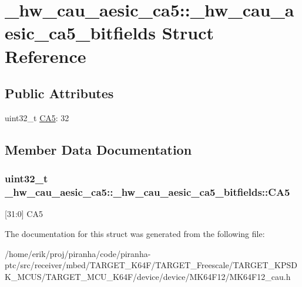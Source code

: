 \hypertarget{struct__hw__cau__aesic__ca5_1_1__hw__cau__aesic__ca5__bitfields}{}\section{\+\_\+hw\+\_\+cau\+\_\+aesic\+\_\+ca5\+:\+:\+\_\+hw\+\_\+cau\+\_\+aesic\+\_\+ca5\+\_\+bitfields Struct Reference}
\label{struct__hw__cau__aesic__ca5_1_1__hw__cau__aesic__ca5__bitfields}
\subsection*{Public Attributes}
\begin{DoxyCompactItemize}
\item 
uint32\+\_\+t \hyperlink{struct__hw__cau__aesic__ca5_1_1__hw__cau__aesic__ca5__bitfields_aa7424c147594c4c75bd752d395c7834c}{C\+A5}\+: 32
\end{DoxyCompactItemize}


\subsection{Member Data Documentation}
\subsubsection[{\texorpdfstring{C\+A5}{CA5}}]{\setlength{\rightskip}{0pt plus 5cm}uint32\+\_\+t \+\_\+hw\+\_\+cau\+\_\+aesic\+\_\+ca5\+::\+\_\+hw\+\_\+cau\+\_\+aesic\+\_\+ca5\+\_\+bitfields\+::\+C\+A5}\hypertarget{struct__hw__cau__aesic__ca5_1_1__hw__cau__aesic__ca5__bitfields_aa7424c147594c4c75bd752d395c7834c}{}\label{struct__hw__cau__aesic__ca5_1_1__hw__cau__aesic__ca5__bitfields_aa7424c147594c4c75bd752d395c7834c}
\mbox{[}31\+:0\mbox{]} C\+A5 

The documentation for this struct was generated from the following file\+:\begin{DoxyCompactItemize}
\item 
/home/erik/proj/piranha/code/piranha-\/ptc/src/receiver/mbed/\+T\+A\+R\+G\+E\+T\+\_\+\+K64\+F/\+T\+A\+R\+G\+E\+T\+\_\+\+Freescale/\+T\+A\+R\+G\+E\+T\+\_\+\+K\+P\+S\+D\+K\+\_\+\+M\+C\+U\+S/\+T\+A\+R\+G\+E\+T\+\_\+\+M\+C\+U\+\_\+\+K64\+F/device/device/\+M\+K64\+F12/M\+K64\+F12\+\_\+cau.\+h\end{DoxyCompactItemize}
